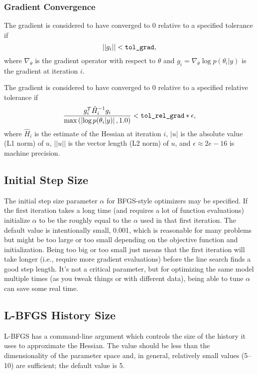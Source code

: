 \subsubsection{Gradient Convergence}

The gradient is considered to have converged to 0 relative to a
specified tolerance  if 
%
\[
|| g_{i} || < \mbox{\code{tol\_grad}},
\]
where $\nabla_{\theta}$ is the gradient operator with respect to
$\theta$ and $g_{i} = \nabla_{\theta} \log p(\theta_{i}|y)$ is the gradient at
iteration $i$.  

The gradient is considered to have converged to 0 relative to a
specified relative tolerance
 if
%
\[
\frac{g_{i}^T \hat{H}_{i}^{-1} g_{i} }{ \max\left(\left|\log p(\theta_{i}|y)\right|,1.0\right) } < \mbox{\code{tol\_rel\_grad}} * \epsilon,
\]
%
where $\hat{H}_{i}$ is the estimate of the Hessian at iteration $i$,
$|u|$ is the absolute value (L1 norm) of $u$, $||u||$ is the vector
length (L2 norm) of $u$, and $\epsilon \approx 2e-16$ is machine
precision.


\subsection{Initial Step Size}

The initial step size parameter $\alpha$ for BFGS-style optimizers may
be specified. If the first iteration takes a long time (and requires a
lot of function evaluations) initialize $\alpha$ to be the roughly
equal to the $\alpha$ used in that first iteration. The default value
is intentionally small, 0.001, which is reasonable for many problems
but might be too large or too small depending on the objective
function and initialization. Being too big or too small just means
that the first iteration will take longer (i.e., require more gradient
evaluations) before the line search finds a good step length. It's not
a critical parameter, but for optimizing the same model multiple times
(as you tweak things or with different data), being able to tune
$\alpha$ can save some real time.

\subsection{L-BFGS History Size}

L-BFGS has a command-line argument which controls the size of the
history it uses to approximate the Hessian. The value should be less than
the dimensionality of the parameter space and, in general, relatively
small values (5--10) are sufficient; the default value is 5.

